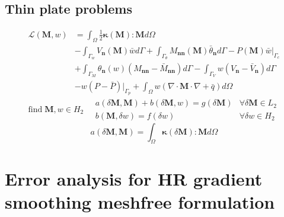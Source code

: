 \documentclass{article}
\begin{document}
\subsection{Thin plate problems}
\begin{equation}\label{plateenergy}
    \begin{split}
        \mathcal L(\boldsymbol M, w) 
        &= \int_{\Omega} \frac{1}{2} \boldsymbol \kappa(\boldsymbol M) : \boldsymbol M d\Omega \\ 
        &- \int_{\Gamma_w} V_{\boldsymbol n}(\boldsymbol M) \bar{w} d\Gamma + \int_{\Gamma_\theta} M_{\boldsymbol{nn}}(\boldsymbol M)\bar{\theta}_{\boldsymbol n} d\Gamma - P(\boldsymbol M)\bar{w}\vert_{\Gamma_c} \\
        &+ \int_{\Gamma_M} \theta_{\boldsymbol n}(w)(M_{\boldsymbol{nn}}-\bar{M}_{\boldsymbol{nn}})d\Gamma - \int_{\Gamma_V} w(V_{\boldsymbol n} - \bar{V}_{\boldsymbol n})d\Gamma \\ 
        &- w(P-\bar P)\vert_{\Gamma_p} + \int_{\Omega} w(\nabla \cdot \boldsymbol M \cdot \nabla + \bar{q})d\Omega
    \end{split}
\end{equation}
\begin{equation}
    \mathrm{find} \; \boldsymbol M, w \in H_2 \quad
    \begin{array}{rr}
    a(\delta \boldsymbol M,\boldsymbol M) + b(\delta \boldsymbol M, w) = g(\delta \boldsymbol M) & \forall \delta \boldsymbol M \in L_2 \\
    b(\boldsymbol M, \delta w) = f(\delta w) & \forall \delta w \in H_2
    \end{array}
\end{equation}
\begin{equation}
    a(\delta \boldsymbol M,\boldsymbol M) = \int_{\Omega} \boldsymbol \kappa(\delta \boldsymbol M): \boldsymbol M d\Omega
\end{equation}

\section{Error analysis for HR gradient smoothing meshfree formulation}

\end{document}

